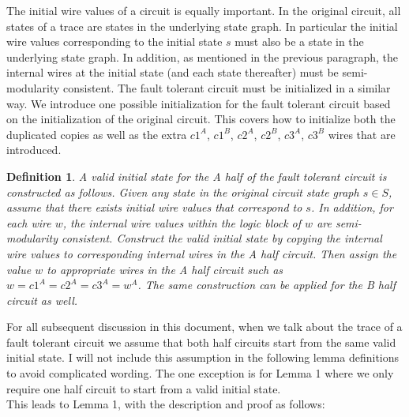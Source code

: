 \documentclass[12pt]{report}
\newtheorem*{definition}{Definition}
\begin{document}
The initial wire values of a circuit is equally important.  In the original circuit, all states of a trace are states in the underlying state graph.  In particular the initial wire values corresponding to the initial state $s$ must also be a state in the underlying state graph.  In addition, as mentioned in the previous paragraph, the internal wires at the initial state (and each state thereafter) must be semi-modularity consistent.   The fault tolerant circuit must be initialized in a similar way.  We introduce one possible initialization for the fault tolerant circuit based on the initialization of the original circuit.  This covers how to initialize both the duplicated copies as well as the extra $c1^A$, $c1^B$, $c2^A$, $c2^B$, $c3^A$, $c3^B$ wires that are introduced.
\begin{definition} A {\em valid initial state} for the A half of the fault tolerant circuit is constructed as follows.  Given any state in the original circuit state graph $s \in S$, assume that there exists initial wire values that correspond to $s$.  In addition, for each wire $w$, the internal wire values within the logic block of $w$ are semi-modularity consistent.  Construct the valid initial state by copying the internal wire values to corresponding internal wires in the A half circuit.  Then assign the value $w$ to appropriate wires in the A half circuit such as $w=c1^A=c2^A=c3^A=w^A$. The same construction can be applied for the B half circuit as well.
\end{definition}
For all subsequent discussion in this document, when we talk about the trace of a fault tolerant circuit we assume that both half circuits start from the same valid initial state.  I will not include this assumption in the following lemma definitions to avoid complicated wording.  %
The one exception is for Lemma 1 where we only require one half circuit to start from a valid initial state.  \\

This leads to Lemma 1, with the description and proof as follows:
\end{document}
